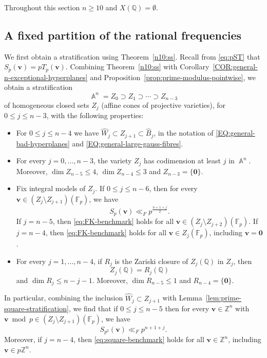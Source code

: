 \documentclass[a4paper,11pt, twoside,reqno]{amsart}
\theoremstyle{plain}
\theoremstyle{definition}
\theoremstyle{remark}
\newcommand{\bfv}{\bm{v}}
\newcommand{\ZZ}{\mathbb{Z}}
\newcommand{\QQ}{\mathbb{Q}}
\DeclareMathOperator{\A}{\mathbb{A}}
\renewcommand{\le}{\leqslant}
\renewcommand{\ge}{\geqslant}
\newcommand{\FF}{\mathbb{F}}
\newcommand{\cone}{\widehat}
\numberwithin{equation}{section}
\begin{document}
Throughout this section $n\ge 10$ and $X(\QQ)=\emptyset$.

\subsection{A fixed partition of the rational frequencies}

We first obtain a stratification using Theorem~\ref{n10:ss}.
Recall from \eqref{eq:pST} that $S_p(\bfv)=pT_p(\bfv)$.
Combining Theorem~\ref{n10:ss} with
Corollary~\ref{COR:general-n-exceptional-hyperplanes}
and Proposition~\ref{prop:prime-modulus-pointwise},
we obtain a stratification
\[
\A^{n}=Z_0
\supset Z_{1}\supset\cdots\supset Z_{n-3}
\]
of homogeneous closed sets $Z_j$
(affine cones of projective varieties),
for $0\le j\le n-3$,
with the following properties:
\begin{itemize}
\item[$i)$]
For $0\le j\le n-4$ we have $\cone W_j \subset Z_{j+1} \subset \cone B_j$,
in the notation of \eqref{EQ:general-bad-hyperplanes}
and \eqref{EQ:general-large-gauss-fibres}.

\item[$ii)$]
For every $j=0,\ldots,n-3$, the variety $Z_j$ has codimension
at least $j$ in $\A^n$.
Moreover, $\dim Z_{n-5} \le 4$,
$\dim Z_{n-4} \le 3$
and $Z_{n-3}=\{\bm0\}$.

\item[$iii)$]
Fix integral models of $Z_j$.
If $0\le j\le n-6$, then
for every $\bfv\in (Z_j\setminus Z_{j+1})(\FF_p)$, we have
\begin{equation}
\label{eq:FK-benchmark}
S_p(\bfv)\ll_F p^{\frac{n+1+j}{2}}.
\end{equation}
If $j=n-5$,
then \eqref{eq:FK-benchmark} holds for all $\bfv\in (Z_j\setminus Z_{j+2})(\FF_p)$.
If $j=n-4$,
then \eqref{eq:FK-benchmark} holds for all $\bfv\in Z_j(\FF_p)$, including $\bfv=\bm0$.

\item[$iv)$]
For every $j=1,\ldots,n-4$,
if $R_j$ is the Zariski closure of $Z_j(\QQ)$ in $Z_j$, then
\begin{equation}
\label{ZjRj6}
Z_j(\QQ)=R_j(\QQ)
\end{equation}
and $\dim R_j \le n-j-1$.
Moreover, $\dim R_{n-5} \le 1$
and $R_{n-4} = \{\bm0\}$.
\end{itemize}
In particular, combining the inclusion $\cone W_j \subset Z_{j+1}$
with Lemma~\ref{lem:prime-square-stratification},
we find that if $0\le j\le n-5$ then 
for every $\bfv\in \ZZ^n$ with $\bfv\bmod{p}\in (Z_j\setminus Z_{j+1})(\FF_p)$, we have
\begin{equation}
\label{eq:square-benchmark}
S_{p^2}(\bfv)\ll_F p^{n+1+j}.
\end{equation}
Moreover, if $j=n-4$,
then \eqref{eq:square-benchmark} holds for all $\bfv\in \ZZ^n$, including $\bfv\in p\ZZ^n$.
\end{document}

